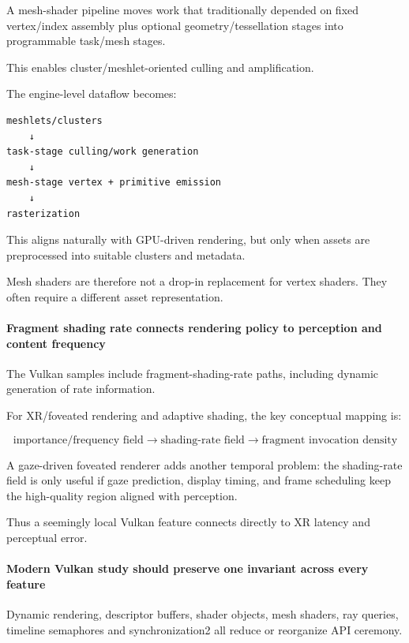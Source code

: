 A mesh-shader pipeline moves work that traditionally depended on fixed vertex/index assembly plus optional geometry/tessellation stages into programmable task/mesh stages.

This enables cluster/meshlet-oriented culling and amplification.

The engine-level dataflow becomes:

\begin{verbatim}
meshlets/clusters
    ↓
task-stage culling/work generation
    ↓
mesh-stage vertex + primitive emission
    ↓
rasterization
\end{verbatim}

This aligns naturally with GPU-driven rendering, but only when assets are preprocessed into suitable clusters and metadata.

Mesh shaders are therefore not a drop-in replacement for vertex shaders. They often require a different asset representation.

\paragraph{Fragment shading rate connects rendering policy to perception and content frequency}\label{fragment-shading-rate-connects-rendering-policy-to-perception-and-content-frequency}

The Vulkan samples include fragment-shading-rate paths, including dynamic generation of rate information.

For XR/foveated rendering and adaptive shading, the key conceptual mapping is:

\[
\text{importance/frequency field}
\rightarrow
\text{shading-rate field}
\rightarrow
\text{fragment invocation density}
\]

A gaze-driven foveated renderer adds another temporal problem: the shading-rate field is only useful if gaze prediction, display timing, and frame scheduling keep the high-quality region aligned with perception.

Thus a seemingly local Vulkan feature connects directly to XR latency and perceptual error.

\paragraph{Modern Vulkan study should preserve one invariant across every feature}\label{modern-vulkan-study-should-preserve-one-invariant-across-every-feature}

Dynamic rendering, descriptor buffers, shader objects, mesh shaders, ray queries, timeline semaphores and synchronization2 all reduce or reorganize API ceremony.

